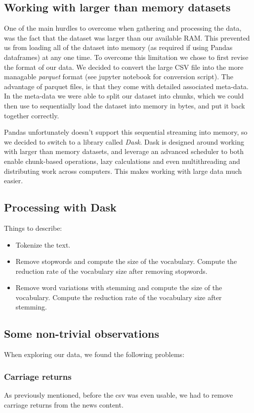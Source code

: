 \documentclass{article}
\begin{document}
\subsection{Working with larger than memory datasets}
One of the main hurdles to overcome when gathering and processing the data, was the fact that the dataset was larger
than our available RAM. This prevented us from loading all of the dataset into memory (as required if using Pandas
dataframes) at any one time. To overcome this limitation we chose to first revise the format of our data. We decided to
convert the large CSV file into the more managable \textit{parquet} format (see jupyter notebook for conversion script). The advantage of parquet files, is that they
come with detailed associated meta-data. In the meta-data we were able to split our dataset into chunks, which we could
then use to sequentially load the dataset into memory in bytes, and put it back together correctly.

Pandas unfortunately doesn't support this sequential streaming into memory, so we decided to switch to a library called
\textit{Dask}. Dask is designed around working with larger than memory datasets, and leverage an advanced scheduler to both
enable chunk-based operations, lazy calculations and even multithreading and distributing work across computers. This makes working with large data much easier.
\subsection{Processing with Dask}
Things to describe:
\begin{itemize}
    \item Tokenize the text.
    \item Remove stopwords and compute the size of the vocabulary. Compute the reduction rate of the vocabulary size after removing stopwords.
    \item Remove word variations with stemming and compute the size of the vocabulary. Compute the reduction rate of the vocabulary size after stemming.
\end{itemize}
    
    
    

\subsection{Some non-trivial observations}
When exploring our data, we found the following problems:
\subsubsection{Carriage returns}
As previously mentioned, before the csv was even usable, we had to remove carriage returns from the news content.
\end{document}
